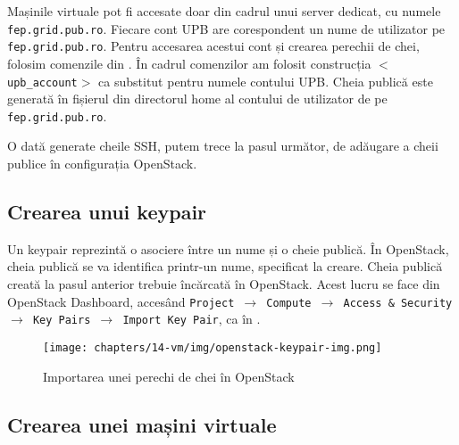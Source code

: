 Mașinile virtuale pot fi accesate doar din cadrul unui server dedicat, cu numele \texttt{fep.grid.pub.ro}.
Fiecare cont UPB are corespondent un nume de utilizator pe \texttt{fep.grid.pub.ro}.
Pentru accesarea acestui cont și crearea perechii de chei, folosim comenzile din .
În cadrul comenzilor am folosit construcția \texttt{$<$upb\_account$>$} ca substitut pentru numele contului UPB.
Cheia publică este generată în fișierul  din directorul home al contului de utilizator de pe \texttt{fep.grid.pub.ro}.


O dată generate cheile SSH, putem trece la pasul următor, de adăugare a cheii publice în configurația OpenStack.

\subsection{Crearea unui keypair}
\label{sec:vm:upb-openstack:keypares}

Un keypair reprezintă o asociere între un nume și o cheie publică. În OpenStack,
cheia publică se va identifica printr-un nume, specificat la creare. Cheia
publică creată la pasul anterior trebuie încărcată în OpenStack. Acest lucru se
face din OpenStack Dashboard, accesând \texttt{Project $\rightarrow$ Compute $\rightarrow$ Access \& Security $\rightarrow$ Key Pairs $\rightarrow$ Import Key Pair}, ca în .

\begin{figure}[!htbp]
  \centering
  \texttt{[image: chapters/14-vm/img/openstack-keypair-img.png]}
  \caption{Importarea unei perechi de chei în OpenStack}
  \label{fig:vm:openstack-keypair}
\end{figure}

\subsection{Crearea unei mașini virtuale}
\label{sec:vm:upb-openstack:createvm}

